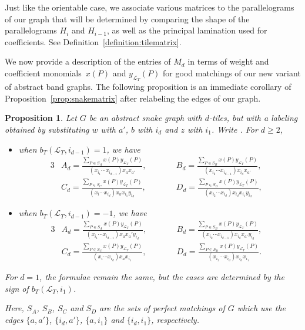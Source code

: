 \documentclass[10pt,a4paper]{amsart}
\numberwithin{equation}{section}
\newtheorem{Proposition}[Theorem]{Proposition}
\theoremstyle{definition}
\begin{document}
Just like the orientable case, we associate various matrices to the parallelograms of our graph that will be determined by comparing the shape of the parallelograms $H_i$ and $H_{i-1}$, as well as the principal lamination used for coefficients. See Definition~\ref{definition:tilematrix}.

We now provide a description of the entries of $M_d$ in terms of weight and coefficient monomials~$x(P)$ and $y_{\mathcal{L}_T}(P)$ for good matchings of our new variant of abstract band graphs. The following proposition is an immediate corollary of Proposition~\ref{prop:snakematrix} after relabeling the edges of our graph.

\begin{Proposition}\label{prop:quasibandmatrix}
Let $G$ be an abstract snake graph with $d$-tiles, but with a labeling obtained by substituting $w$ with $a'$, $b$ with $i_d$ and $z$ with $i_1$. Write .
For $d\geq 2$,
\begin{itemize}\itemsep=0pt
\item when $b_{T}(\mathcal{L}_{T}, {i_{d-1}})=1$, we have
\begin{alignat*}{3}
& A_d = \frac{\sum_{P\in S_A}x(P)y_{\mathcal{L}_T}(P)}{(x_{i_1}\cdots x_{i_{d-1}})x_ax_{a'}} ,\qquad&& B_d = \frac{\sum_{P\in S_B}x(P)y_{\mathcal{L}_T}(P)}{(x_{i_2}\cdots x_{i_{d-1}})x_{i_d}x_{a'}},\\
&C_d = \frac{\sum_{P\in S_C}x(P)y_{\mathcal{L}_T}(P)}{(x_{i}\cdots x_{i_d})x_ax_{i_1}y_{i_d}} ,\qquad&& D_d = \frac{\sum_{P\in S_D}x(P)y_{\mathcal{L}_T}(P)}{(x_{i_2}\cdots x_{i_{d}})x_{i_d}x_{i_1}y_{i_d}},&
\end{alignat*}
\item when $b_{T}(\mathcal{L}_{T}, i_{d-1})=-1$, we have
\begin{alignat*}{3}
& A_d = \frac{\sum_{P\in S_A}x(P)y_{\mathcal{L}_T}(P)}{(x_{i_1}\cdots x_{i_{d-1}})x_ax_a'y_{i_d}} ,\qquad&& B_d = \frac{\sum_{P\in S_B}x(P)y_{\mathcal{L}_T}(P)}{(x_{i_2}\cdots x_{i_{d-1}})x_{i_d}x_{a'} y_{i_d}},&\\
& C_d = \frac{\sum_{P\in S_C}x(P)y_{\mathcal{L}_T}(P)}{(x_{i}\cdots x_{i_d})x_ax_{i_1}},\qquad&& D_d = \frac{\sum_{P\in S_D}x(P)y_{\mathcal{L}_T}(P)}{(x_{i_2}\cdots x_{i_{d}})x_{i_d}x_{i_1}}.&
\end{alignat*}
\end{itemize}
\noindent For $d=1$, the formulae remain the same, but the cases are determined by the sign of $b_T(\mathcal{L}_T, i_1)$.


\noindent Here, $S_A$, $S_B$, $S_C$ and $S_D$ are the sets of perfect matchings of $G$ which use the edges $\{a, a'\}$, $ \{i_d, a'\}$, $\{a, i_1\}$ and $\{i_d, i_1\}$, respectively.
\end{Proposition}
\end{document}
